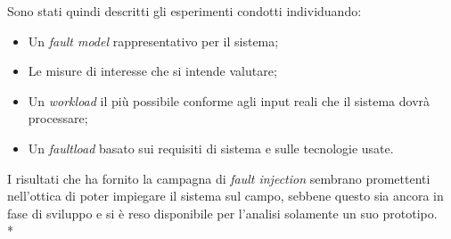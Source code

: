 Sono stati quindi descritti gli esperimenti condotti individuando:
\begin{itemize}
	\item Un \emph{fault model} rappresentativo per il sistema;
	\item Le misure di interesse che si intende valutare;
	\item Un \emph{workload} il pi\`u possibile conforme agli input reali che il sistema dovr\`a processare;
	\item Un \emph{faultload} basato sui requisiti di sistema e sulle tecnologie usate.
\end{itemize}
I risultati che ha fornito la campagna di \emph{fault injection} sembrano promettenti nell'ottica di poter impiegare il sistema sul campo, sebbene questo sia ancora in fase di sviluppo e si \`e reso disponibile per l'analisi solamente un suo prototipo.\\*